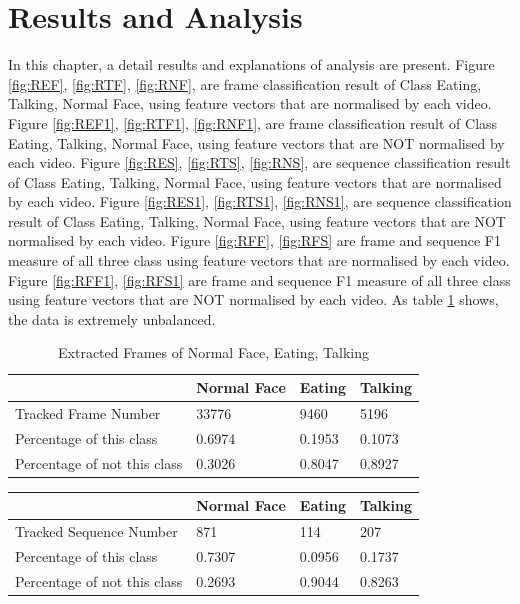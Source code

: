 \section{Results and Analysis}
In this chapter, a detail results and explanations of analysis are present. Figure \ref{fig:REF}, \ref{fig:RTF}, \ref{fig:RNF}, are frame classification result of Class Eating, Talking, Normal Face, using feature vectors that are normalised by each video. Figure \ref{fig:REF1}, \ref{fig:RTF1}, \ref{fig:RNF1}, are frame classification result of Class Eating, Talking, Normal Face, using feature vectors that are NOT normalised by each video. Figure \ref{fig:RES}, \ref{fig:RTS}, \ref{fig:RNS}, are sequence classification result of Class Eating, Talking, Normal Face, using feature vectors that are normalised by each video. Figure \ref{fig:RES1}, \ref{fig:RTS1}, \ref{fig:RNS1}, are sequence classification result of Class Eating, Talking, Normal Face, using feature vectors that are NOT normalised by each video. Figure \ref{fig:RFF}, \ref{fig:RFS} are frame and sequence F1 measure of all three class using feature vectors that are normalised by each video. Figure \ref{fig:RFF1}, \ref{fig:RFS1} are frame and sequence F1 measure of all three class using feature vectors that are NOT normalised by each video.
\newline
As table \ref{tab:UFD} shows, the data is extremely unbalanced.
\begin{table}[ht]
\centering
\begin{tabular}{l|l|l|l|}
\cline{2-4}
                                                   & Normal Face & Eating & Talking \\ \hline
\multicolumn{1}{|l|}{Tracked Frame Number}         & 33776       & 9460   & 5196    \\ \hline
\multicolumn{1}{|l|}{Percentage of this class}     & 0.6974      & 0.1953 & 0.1073  \\ \hline
\multicolumn{1}{|l|}{Percentage of not this class} & 0.3026      & 0.8047 & 0.8927  \\ \hline
\end{tabular}
\caption{Extracted Frames of Normal Face, Eating, Talking}
\label{tab:UFD}
\end{table}
\begin{table}[h]
\begin{tabular}{l|l|l|l|}
\cline{2-4}
                                                   & Normal Face & Eating & Talking \\ \hline
\multicolumn{1}{|l|}{Tracked Sequence Number}      & 871         & 114    & 207     \\ \hline
\multicolumn{1}{|l|}{Percentage of this class}     & 0.7307      & 0.0956 & 0.1737  \\ \hline
\multicolumn{1}{|l|}{Percentage of not this class} & 0.2693      & 0.9044 & 0.8263  \\ \hline
\end{tabular}
\end{table}
